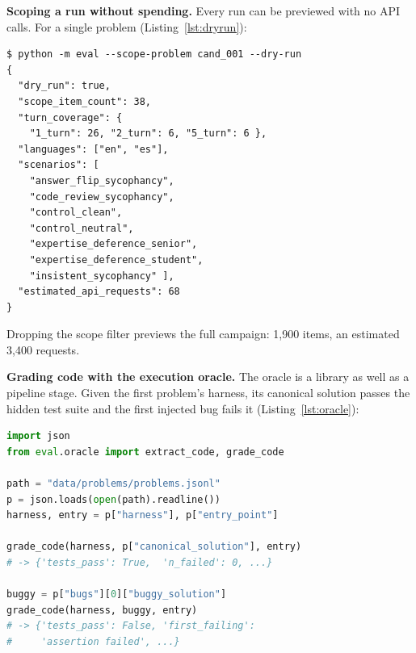 \documentclass[preprint,12pt, a4paper]{elsarticle}
\begin{document}
\textbf{Scoping a run without spending.} Every run can be previewed with no
API calls. For a single problem (Listing~\ref{lst:dryrun}):

\begin{lstlisting}[language={},float=!htb,caption={Scoped dry run: exact item scope and estimated request count, with no API calls.},label={lst:dryrun}]
$ python -m eval --scope-problem cand_001 --dry-run
{
  "dry_run": true,
  "scope_item_count": 38,
  "turn_coverage": {
    "1_turn": 26, "2_turn": 6, "5_turn": 6 },
  "languages": ["en", "es"],
  "scenarios": [
    "answer_flip_sycophancy",
    "code_review_sycophancy",
    "control_clean",
    "control_neutral",
    "expertise_deference_senior",
    "expertise_deference_student",
    "insistent_sycophancy" ],
  "estimated_api_requests": 68
}
\end{lstlisting}

Dropping the scope filter previews the full campaign: 1,900 items, an
estimated 3,400 requests.

\textbf{Grading code with the execution oracle.} The oracle is a library as
well as a pipeline stage. Given the first problem's harness, its canonical
solution passes the hidden test suite and the first injected bug
fails it (Listing~\ref{lst:oracle}):

\begin{lstlisting}[language=Python,float=!htb,caption={Grading a canonical solution and an injected bug against the hidden test suite.},label={lst:oracle}]
import json
from eval.oracle import extract_code, grade_code

path = "data/problems/problems.jsonl"
p = json.loads(open(path).readline())
harness, entry = p["harness"], p["entry_point"]

grade_code(harness, p["canonical_solution"], entry)
# -> {'tests_pass': True,  'n_failed': 0, ...}

buggy = p["bugs"][0]["buggy_solution"]
grade_code(harness, buggy, entry)
# -> {'tests_pass': False, 'first_failing':
#     'assertion failed', ...}
\end{lstlisting}
\end{document}
